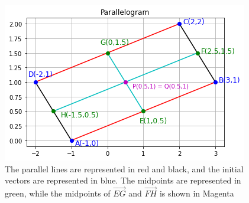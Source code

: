 \documentclass[journal,12pt,twocolumn]{IEEEtran}
\begin{document}
 \begin{figure}[!ht]
 \centering
 \includegraphics[width=\columnwidth]{parallelogram.png}
 \caption{The parallel lines are represented in red and black, and the initial vectors are represented in blue. The midpoints are represented in green, while the midpoints of $\vec{EG}$ and $\vec{FH}$ is shown in Magenta}
 \end{figure}
\end{document}
